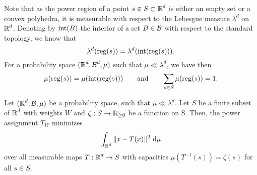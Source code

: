 \documentclass[
     12pt,         %
     a4paper,      %
     BCOR=10mm,     %
     DIV=14,        %
     ]{scrreprt}
\begin{document}
%
%
%
    \begin{rem*} \label{rem::measurabilty}
        Note that as the power region of a point $s\in S\subset \operatorname{\mathbb{R}}^d$ is either an empty set or a convex polyhedra, it is measurable with respect to the Lebesgue measure $\lambda^d$ on $\operatorname{\mathbb{R}}^d$.
        Denoting by $\operatorname{int}(B)$ the interior of a set $B \in \operatorname{\mathcal{B}}$ with respect to the standard topology, we know that  
        \[\lambda^d(\operatorname{reg}(s)) = \lambda^d({\operatorname{int}(\operatorname{reg}(s)})).\]
        For a probability space $(\operatorname{\mathbb{R}}^d,\operatorname{\mathcal{B}}^d,\mu)$ such that $\mu \ll \lambda^d$, we have then
        \[\mu(\operatorname{reg}(s)) = \mu(\operatorname{int}({\operatorname{reg}(s)})) \quad \quad \text{and} \quad \quad \sum_{s\in S} \mu(\operatorname{reg}(s))=1.\]

        
    \end{rem*}
    \begin{lem} \label{lemma::1step}
        Let $(\operatorname{\mathbb{R}}^d,\operatorname{\mathcal{B}},\mu)$ be a probability space, such that $\mu \ll \lambda^d$.  Let $S$ be a finite subset of $\operatorname{\mathbb{R}}^d$ with weights $W$ and $\zeta: S \to \operatorname{\mathbb{R}}_{\ge 0}$ be a function on S.
        Then, the power assignment $T_W $ minimizes 
        \[\int_{\operatorname{\mathbb{R}}^d} \|x-T(x) \|^2 \ {\operatorname{{\mathrm{d}}}} \mu \]
        over all measurable maps $T : \operatorname{\mathbb{R}}^d \to S $ with capacities $\mu(T^{-1} (s)) = \zeta(s)  $ for all $s\in S$.
    \end{lem}
\end{document}
